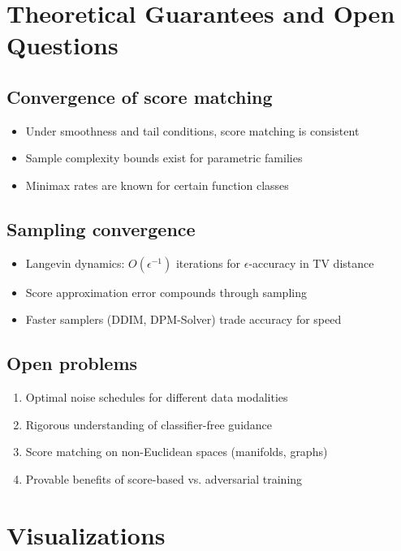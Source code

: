 \documentclass[11pt]{article}
\theoremstyle{definition}
\begin{document}
\section{Theoretical Guarantees and Open Questions}

\subsection{Convergence of score matching}
\begin{itemize}
\item Under smoothness and tail conditions, score matching is consistent
\item Sample complexity bounds exist for parametric families
\item Minimax rates are known for certain function classes
\end{itemize}

\subsection{Sampling convergence}
\begin{itemize}
\item Langevin dynamics: $O(\epsilon^{-1})$ iterations for $\epsilon$-accuracy in TV distance
\item Score approximation error compounds through sampling
\item Faster samplers (DDIM, DPM-Solver) trade accuracy for speed
\end{itemize}

\subsection{Open problems}
\begin{enumerate}
\item Optimal noise schedules for different data modalities
\item Rigorous understanding of classifier-free guidance
\item Score matching on non-Euclidean spaces (manifolds, graphs)
\item Provable benefits of score-based vs. adversarial training
\end{enumerate}

\section{Visualizations}
\end{document}
